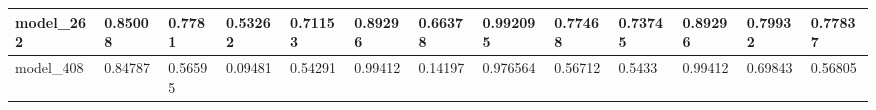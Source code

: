 \begin{tabular}{|l|l|l|l|l|l|l|l|l|l|l|l|l|}
model\_262     & 0.85008     & 0.7781         & 0.53262      & 0.71153          & 0.89296              & 0.66378              & 0.992095     & 0.77468           & 0.73745            & 0.89296         & 0.79932     & 0.77837      \\ \hline
model\_408     & 0.84787     & 0.56595        & 0.09481      & 0.54291          & 0.99412              & 0.14197              & 0.976564     & 0.56712           & 0.5433             & 0.99412         & 0.69843     & 0.56805      \\ \hline
\end{tabular}